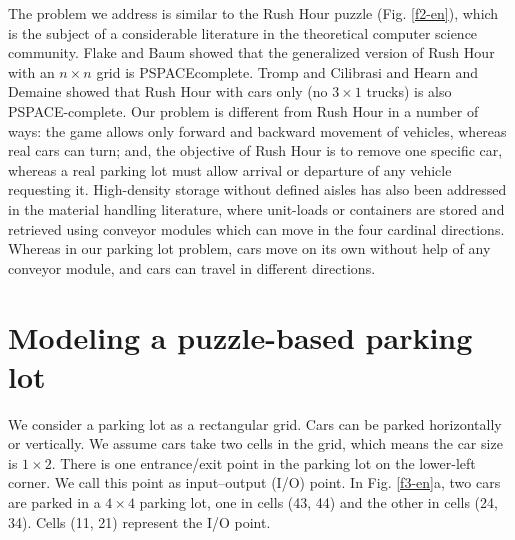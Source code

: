 

The problem we address is similar to the Rush Hour puzzle (Fig. \ref{f2-en}), which is the subject of a considerable literature in the theoretical computer science community. Flake and Baum showed that the generalized version of Rush Hour with an $n \times n$ grid is PSPACEcomplete. Tromp and Cilibrasi and Hearn and Demaine showed that Rush Hour with cars only (no $3 \times 1$ trucks) is also PSPACE-complete. Our problem is different from Rush Hour in a number of ways: the game allows only forward and backward movement of vehicles, whereas real cars can turn; and, the objective of Rush Hour is to remove one specific car, whereas a real parking lot must allow arrival or departure of any vehicle requesting it. High-density storage without defined aisles has also been addressed in the material handling literature, where unit-loads or containers are stored and retrieved using conveyor modules which can move in the four cardinal directions. Whereas in our parking lot problem, cars move on its own without help of any conveyor module, and cars can travel in different directions.

\section{Modeling a puzzle-based parking lot}

We consider a parking lot as a rectangular grid. Cars can be parked horizontally or vertically. We assume cars take two cells in the grid, which means the car size is $1 \times 2$. There is one entrance/exit point in the parking lot on the lower-left corner. We call this point as input–output (I/O) point. In Fig. \ref{f3-en}a, two cars are parked in a $4 \times 4$ parking lot, one in cells (43, 44) and the other in cells (24, 34). Cells (11, 21) represent the I/O point.


